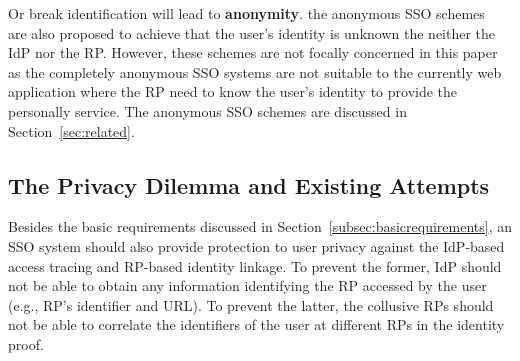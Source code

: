 Or break identification will lead to \textbf{anonymity}. the anonymous SSO schemes~\cite{ElmuftiWRR08,WangWS13,HanCSTW18} are also proposed to achieve that the user's identity is unknown the neither the IdP nor the RP. However, these schemes are not focally concerned in this paper as the completely anonymous SSO systems are not suitable to the currently web application where the RP need to know the user's identity to provide the personally service. The anonymous SSO schemes are discussed in Section~\ref{sec:related}.


\subsection{The Privacy Dilemma and Existing Attempts}
\label{subsec:challenges}
\begin{comment}
In UPRESSO, the adversaries' goals to break the secure authentication are as follows:
\begin{itemize}
\item Impersonation attack: Adversary logs in to the honest RP as an honest user. The adversary might achieve the goal by obtaining a user's identity proof in the ways, such as stealing the proof (from the unprotected HTTP transmission), forging the valid proof (if the integrity is not guaranteed), leading the user to upload a proof valid for other RPs (the proof is not bound with specific RP).
\item Identity Injection: Honest user logs in to the honest RP under adversaries' identity. The adversary might achieve this goal by replacing the identity transmitted from IdP to RP or lead the user uploads the malicious identity proof in various ways (e.g., CSRF).
\end{itemize}
\end{comment}


Besides the basic requirements discussed in Section~\ref{subsec:basicrequirements}, an SSO system should also provide protection to user privacy against the IdP-based access tracing and RP-based identity linkage. To prevent the former,  IdP should not be able to obtain any information identifying the RP accessed by the user (e.g., RP's identifier and URL). To prevent the latter, the collusive RPs should not be able to correlate the identifiers of the user at different RPs in the identity proof.


